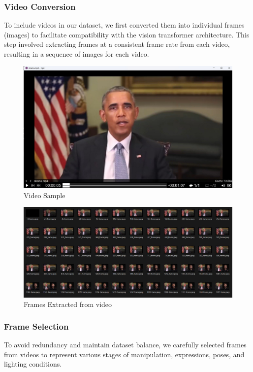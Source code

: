 \subsubsection{Video Conversion}
To include videos in our dataset, we first converted them into individual frames (images) to facilitate compatibility with the vision transformer architecture. This step involved extracting frames at a consistent frame rate from each video, resulting in a sequence of images for each video.
\begin{figure}[htbp]
    \centering
    \includegraphics[width= 5in ]{img/framesExtracted.jpg}
    \caption{Video Sample}
\end{figure}
\begin{figure}[ht]
    \centering
    \includegraphics[width= 5in ]{img/frames.jpg}
    \caption{Frames Extracted from video}
\end{figure}

\subsubsection{Frame Selection}
To avoid redundancy and maintain dataset balance, we carefully selected frames from videos to represent various stages of manipulation, expressions, poses, and lighting conditions.

